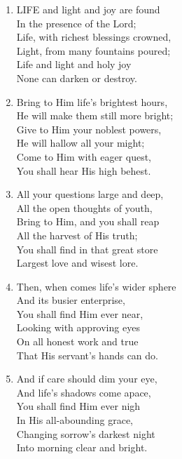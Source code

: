 \begin{enumerate}
    \item LIFE and light and joy are found \\
        In the presence of the Lord; \\
        Life, with richest blessings crowned, \\
        Light, from many fountains poured; \\
        Life and light and holy joy \\
        None can darken or destroy.

    \item Bring to Him life's brightest hours, \\
        He will make them still more bright; \\
        Give to Him your noblest powers, \\
        He will hallow all your might; \\
        Come to Him with eager quest, \\
        You shall hear His high behest.

    \item All your questions large and deep, \\
        All the open thoughts of youth, \\
        Bring to Him, and you shall reap \\
        All the harvest of His truth; \\
        You shall find in that great store \\
        Largest love and wisest lore.

    \item Then, when comes life's wider sphere \\
        And its busier enterprise, \\
        You shall find Him ever near, \\
        Looking with approving eyes \\
        On all honest work and true \\
        That His servant's hands can do.

    \item And if care should dim your eye, \\
        And life's shadows come apace, \\
        You shall find Him ever nigh \\
        In His all-abounding grace, \\
        Changing sorrow's darkest night \\
        Into morning clear and bright.

\end{enumerate}

